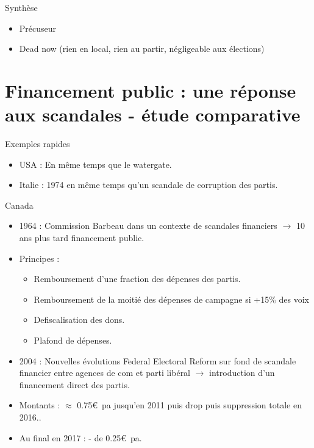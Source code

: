 \documentclass[10pt,t]{beamer}
\begin{document}
\begin{frame}{Synthèse}
    \begin{itemize}
        \item Précuseur
        \item Dead now (rien en local, rien au partir, négligeable aux élections)
    \end{itemize}
\end{frame}

\section{Financement public : une réponse aux scandales - étude comparative}
\begin{frame}{Exemples rapides}
    \begin{itemize}
        \item \alert{USA} : En même temps que le watergate.
        \item \alert{Italie} : 1974 en même temps qu'un scandale de corruption des partis.
    \end{itemize}
\end{frame}

\begin{frame}{Canada}
    \begin{itemize}
        \item \alert{1964} : Commission Barbeau dans un contexte de scandales financiers $\rightarrow$ 10 ans plus tard financement public.
        \item \alert{Principes} :
            \begin{itemize}
                \item Remboursement d'une fraction des dépenses des partis.
                \item Remboursement de la moitié des dépenses de campagne si +15\% des voix
                \item Defiscalisation des dons.
                \item Plafond de dépenses.
            \end{itemize}
        \item \alert{2004} : Nouvelles évolutions Federal Electoral Reform sur fond de scandale financier entre agences de com et parti libéral $\rightarrow$ introduction d'un financement direct des partis.
        \item \alert{Montants} : $\approx$ 0.75\euro\ pa jusqu'en 2011 puis drop puis suppression totale en 2016..
        \item Au final en 2017 : - de 0.25\euro\ pa.
    \end{itemize}
\end{frame}
\end{document}
